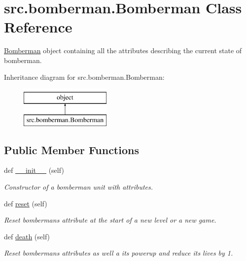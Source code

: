 \hypertarget{classsrc_1_1bomberman_1_1_bomberman}{}\section{src.\+bomberman.\+Bomberman Class Reference}
\label{classsrc_1_1bomberman_1_1_bomberman}


\hyperlink{classsrc_1_1bomberman_1_1_bomberman}{Bomberman} object containing all the attributes describing the current state of bomberman.  


Inheritance diagram for src.\+bomberman.\+Bomberman\+:\begin{figure}[H]
\begin{center}
\leavevmode
\includegraphics[height=2.000000cm]{classsrc_1_1bomberman_1_1_bomberman}
\end{center}
\end{figure}
\subsection*{Public Member Functions}
\begin{DoxyCompactItemize}
\item 
\hypertarget{classsrc_1_1bomberman_1_1_bomberman_ad9cdb2bcd44e1aaec299743531de5473}{}def \hyperlink{classsrc_1_1bomberman_1_1_bomberman_ad9cdb2bcd44e1aaec299743531de5473}{\+\_\+\+\_\+init\+\_\+\+\_\+} (self)\label{classsrc_1_1bomberman_1_1_bomberman_ad9cdb2bcd44e1aaec299743531de5473}

\begin{DoxyCompactList}\small\item\em Constructor of a bomberman unit with attributes. \end{DoxyCompactList}\item 
\hypertarget{classsrc_1_1bomberman_1_1_bomberman_a7d6de2893ff7ce0bed4cd72f15e9eb20}{}def \hyperlink{classsrc_1_1bomberman_1_1_bomberman_a7d6de2893ff7ce0bed4cd72f15e9eb20}{reset} (self)\label{classsrc_1_1bomberman_1_1_bomberman_a7d6de2893ff7ce0bed4cd72f15e9eb20}

\begin{DoxyCompactList}\small\item\em Reset bomberman\textquotesingle{}s attribute at the start of a new level or a new game. \end{DoxyCompactList}\item 
\hypertarget{classsrc_1_1bomberman_1_1_bomberman_ae596075451ff8d73d59ff2cf9e4f7848}{}def \hyperlink{classsrc_1_1bomberman_1_1_bomberman_ae596075451ff8d73d59ff2cf9e4f7848}{death} (self)\label{classsrc_1_1bomberman_1_1_bomberman_ae596075451ff8d73d59ff2cf9e4f7848}

\begin{DoxyCompactList}\small\item\em Reset bomberman\textquotesingle{}s attributes as well a its powerup and reduce its lives by 1. \end{DoxyCompactList}\end{DoxyCompactItemize}
